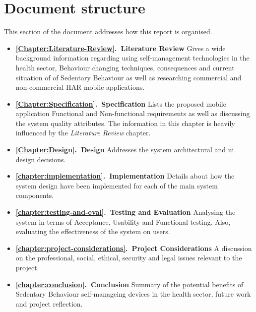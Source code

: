     \section{Document structure}
    This section of the document addresses how this report is organised.
    \begin{itemize}
        \item \textbf{\ref{Chapter:Literature-Review}.\ Literature Review} Gives a wide background information regarding using self-management technologies in the health sector, Behaviour changing techniques, consequences and current situation of of Sedentary Behaviour as well as researching commercial and non-commercial HAR mobile applications.
        \item \textbf{\ref{Chapter:Specification}.\ Specification} Lists the proposed mobile application Functional and Non-functional requirements as well as discussing the system quality attributes. The information in this chapter is heavily influenced by the \textit{Literature Review} chapter.
        \item \textbf{\ref{Chapter:Design}.\ Design} Addresses the system architectural and \gls{ui} design decisions.
        \item \textbf{\ref{chapter:implementation}.\ Implementation} Details about how the system design have been implemented for each of the main system components.
        \item \textbf{\ref{chapter:testing-and-eval}.\ Testing and Evaluation} Analysing the system in terms of Acceptance, Usability and Functional testing. Also, evaluating the effectiveness of the system on users.
        \item \textbf{\ref{chapter:project-considerations}.\ Project Considerations} A discussion on the professional, social, ethical, security and legal issues relevant to the project.
        \item \textbf{\ref{chapter:conclusion}.\ Conclusion} Summary of the potential benefits of Sedentary Behaviour self-manageing devices in the health sector, future work and project reflection.
    \end{itemize}
